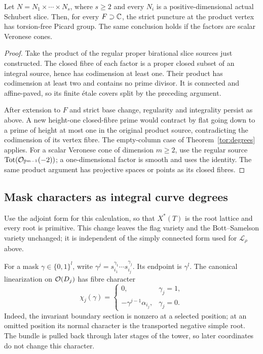 \begin{lemma}\label{tor:products}
Let $N=N_1\times\cdots\times N_s$, where $s\ge2$ and every $N_i$ is a positive-dimensional actual Schubert slice. Then, for every $F\supset\mathbb C$, the strict puncture at the product vertex has torsion-free Picard group. The same conclusion holds if the factors are scalar Veronese cones.
\end{lemma}
\begin{proof}
Take the product of the regular proper birational slice sources just constructed. The closed fibre of each factor is a proper closed subset of an integral source, hence has codimension at least one. Their product has codimension at least two and contains no prime divisor. It is connected and affine-paved, so its finite \'etale covers split by the preceding argument.

After extension to $F$ and strict base change, regularity and integrality persist as above. A new height-one closed-fibre prime would contract by flat going down to a prime of height at most one in the original product source, contradicting the codimension of its vertex fibre. The empty-column case of Theorem~\ref{tor:degrees} applies. For a scalar Veronese cone of dimension $m\ge2$, use the regular source $\operatorname{Tot}(\mathcal O_{\mathbb P^{m-1}}(-2))$; a one-dimensional factor is smooth and uses the identity. The same product argument has projective spaces or points as its closed fibres.
\end{proof}

\subsection{Mask characters as integral curve degrees}
Use the adjoint form for this calculation, so that $X^*(T)$ is the root lattice and every root is primitive. This change leaves the flag variety and the Bott--Samelson variety unchanged; it is independent of the simply connected form used for $\mathcal L_\rho$ above.

For a mask $\gamma\in\{0,1\}^l$, write $\gamma^j=s_{i_1}^{\gamma_1}\cdots s_{i_j}^{\gamma_j}$. Its endpoint is $\gamma^l$. The canonical linearization on $\mathcal O(D_j)$ has fibre character
\begin{equation}\label{tor:characters}
 \chi_j(\gamma)=
 \begin{cases}
  0,&\gamma_j=1,\\
  -\gamma^{j-1}\alpha_{i_j},&\gamma_j=0.
 \end{cases}
\end{equation}
Indeed, the invariant boundary section is nonzero at a selected position; at an omitted position its normal character is the transported negative simple root. The bundle is pulled back through later stages of the tower, so later coordinates do not change this character.

